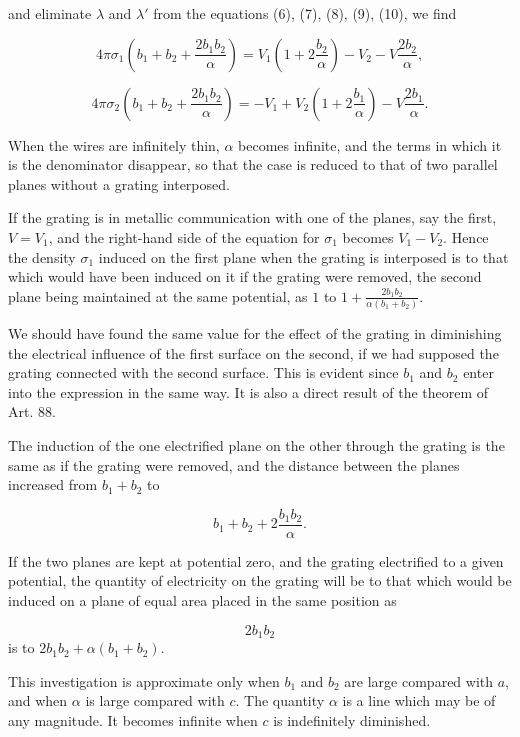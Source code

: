 \documentclass[11pt,a4paper]{article}
\begin{document}
and eliminate $\lambda$ and $\lambda'$ from the equations (6), (7),
(8), (9), (10), we find

\begin{equation}\tag{12}
4\pi\sigma_1\left(b_1+b_2+\frac{2b_1b_2}{\alpha}\right)
=V_1\left(1+2\frac{b_2}{\alpha}\right)-V_2
-V\frac{2b_2}{\alpha},
\end{equation}

\begin{equation}\tag{13}
4\pi\sigma_2\left(b_1+b_2+\frac{2b_1b_2}{\alpha}\right)
=-V_1+V_2\left(1+2\frac{b_1}{\alpha}\right)
-V\frac{2b_1}{\alpha}.
\end{equation}

When the wires are infinitely thin, $\alpha$ becomes infinite, and the
terms in which it is the denominator disappear, so that the case is
reduced to that of two parallel planes without a grating interposed.

If the grating is in metallic communication with one of the planes, say
the first, $V=V_1$, and the right-hand side of the equation for
$\sigma_1$ becomes $V_1-V_2$. Hence the density $\sigma_1$ induced on
the first plane when the grating is interposed is to that which would
have been induced on it if the grating were removed, the second plane
being maintained at the same potential, as $1$ to
$1+\frac{2b_1b_2}{\alpha(b_1+b_2)}$.

We should have found the same value for the effect of the grating in
diminishing the electrical influence of the first surface on the second,
if we had supposed the grating connected with the second surface. This
is evident since $b_1$ and $b_2$ enter into the expression in the same
way. It is also a direct result of the theorem of Art. 88.

The induction of the one electrified plane on the other through the
grating is the same as if the grating were removed, and the distance
between the planes increased from $b_1+b_2$ to

\[
b_1+b_2+2\frac{b_1b_2}{\alpha}.
\]

If the two planes are kept at potential zero, and the grating electrified
to a given potential, the quantity of electricity on the grating will be
to that which would be induced on a plane of equal area placed in the
same position as

\[
2b_1b_2
\]
is to $2b_1b_2+\alpha(b_1+b_2)$.

This investigation is approximate only when $b_1$ and $b_2$ are large
compared with $a$, and when $\alpha$ is large compared with $c$. The
quantity $\alpha$ is a line which may be of any magnitude. It becomes
infinite when $c$ is indefinitely diminished.
\end{document}

